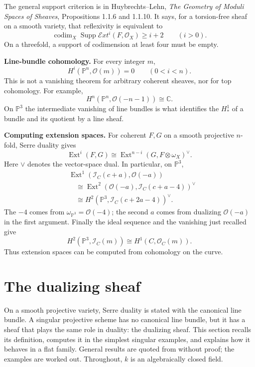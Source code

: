 The general support criterion is in
Huybrechts--Lehn,
\emph{The Geometry of Moduli Spaces
of Sheaves}, Propositions 1.1.6 and
1.1.10. It says, for a torsion-free
sheaf on a smooth variety, that
reflexivity is equivalent to
$$
\operatorname{codim}_X
\operatorname{Supp}
\mathcal{E}xt^i(F,\mathcal{O}_X)
\geq i+2\qquad(i>0).
$$
On a threefold, a support of codimension
at least four must be empty.

\medskip\noindent
\textbf{Line-bundle cohomology.}
\label{paragraph-projective-line-cohomology}
For every integer $m$,
$$
H^i(\mathbb{P}^n,\mathcal{O}(m))=0
\qquad(0<i<n).
$$
This is not a vanishing theorem for
arbitrary coherent sheaves, nor for top
cohomology. For example,
$$
H^n(\mathbb{P}^n,\mathcal{O}(-n-1))
\cong\mathbb{C}.
$$
On $\mathbb{P}^3$ the intermediate
vanishing of line bundles is what
identifies the $H^1_*$ of a bundle and
its quotient by a line sheaf.

\medskip\noindent
\textbf{Computing extension spaces.}
\label{paragraph-curve-extension-duality}
For coherent $F,G$ on a smooth projective
$n$-fold, Serre duality gives
$$
\operatorname{Ext}^i(F,G)
\cong\operatorname{Ext}^{n-i}
(G,F\otimes\omega_X)^\vee.
$$
Here $\vee$ denotes the vector-space
dual. In particular, on $\mathbb{P}^3$,
$$
\begin{aligned}
&\operatorname{Ext}^1
(\mathcal{I}_C(c+a),\mathcal{O}(-a))\\
&\quad\cong\operatorname{Ext}^2
(\mathcal{O}(-a),\mathcal{I}_C(c+a-4))^\vee
\\
&\quad\cong H^2
(\mathbb{P}^3,\mathcal{I}_C(c+2a-4))^\vee.
\end{aligned}
$$
The $-4$ comes from
$\omega_{\mathbb{P}^3}=\mathcal{O}(-4)$;
the second $a$ comes from dualizing
$\mathcal{O}(-a)$ in the first argument.
Finally the ideal sequence and the
vanishing just recalled give
$$
H^2(\mathbb{P}^3,\mathcal{I}_C(m))
\cong H^1(C,\mathcal{O}_C(m)).
$$
Thus extension spaces can be computed
from cohomology on the curve.

\section{The dualizing sheaf}
\label{section-dualizing-sheaf}

On a smooth projective variety, Serre
duality is stated with the canonical line
bundle. A singular projective scheme has
no canonical line bundle, but it has a
sheaf that plays the same role in duality:
the dualizing sheaf. This section recalls
its definition, computes it in the
simplest singular examples, and explains
how it behaves in a flat family. General
results are quoted from \cite{har} without
proof; the examples are worked out.
Throughout, $k$ is an algebraically closed
field.

